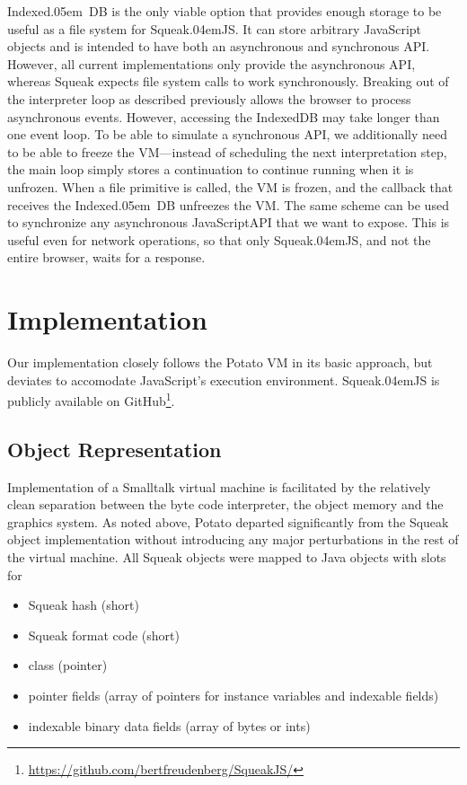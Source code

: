 \documentclass[natbib]{sigplanconf}
\newcommand*\SqueakJS{Squeak\texorpdfstring{\kern.04em}{}JS\xspace}
\newcommand*\JS{JavaScript\xspace}
\newcommand*\IndexedDB{\mbox{Indexed\kern.05em DB}\xspace}
\begin{document}
\IndexedDB is the only viable option that provides enough storage to
be useful as a file system for \SqueakJS. It can store arbitrary \JS
objects and is intended to have both an asynchronous and synchronous
\ac{API}. However, all current implementations only provide the
asynchronous \ac{API}, whereas Squeak expects file system calls to
work synchronously. Breaking out of the interpreter loop as described
previously allows the browser to process asynchronous events. However,
accessing the IndexedDB may take longer than one event loop. To be
able to simulate a synchronous API, we additionally need to be able to
freeze the \ac{VM}---instead of scheduling the next interpretation
step, the main loop simply stores a continuation to continue running
when it is unfrozen. When a file primitive is called, the \ac{VM} is
frozen, and the callback that receives the \IndexedDB unfreezes the
\ac{VM}. The same scheme can be used to synchronize any asynchronous
\JS \ac{API} that we want to expose. This is useful even for network
operations, so that only \SqueakJS, and not the entire browser, waits
for a response.


\section{Implementation}
\label{sec:impl}

Our implementation closely follows the Potato \ac{VM} in its basic
approach, but deviates to accomodate \JS's execution
environment. \SqueakJS is publicly available on
GitHub\footnote{\url{https://github.com/bertfreudenberg/SqueakJS/}}.

\subsection{Object Representation}
\label{sec:objrep}

Implementation of a Smalltalk virtual machine is facilitated by the
relatively clean separation between the byte code interpreter, the
object memory and the graphics system. As noted above, Potato departed
significantly from the Squeak object implementation without
introducing any major perturbations in the rest of the virtual
machine. All Squeak objects were mapped to Java objects with slots for

\begin{itemize}
\item Squeak hash (short)
\item Squeak format code (short)
\item class (pointer)
\item pointer fields (array of pointers for instance variables and indexable fields)
\item indexable binary data fields (array of bytes or ints)
\end{itemize}
\end{document}
